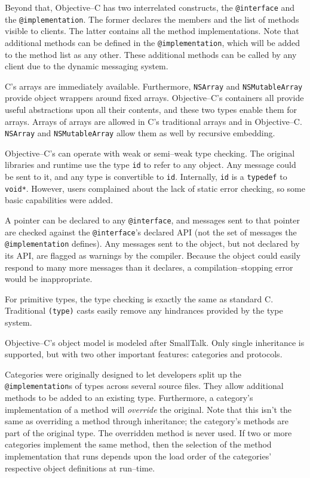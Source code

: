 Beyond that, Objective--C has two interrelated constructs, the
\texttt{@interface} and the \texttt{@implementation}. The former
declares the members and the list of methods visible to clients. The latter
contains all the method implementations. Note that additional methods can be
defined in the \texttt{@implementation}, which will be added to the method
list as any other. These additional methods can be called by any client due to
the dynamic messaging system.

C's arrays are immediately available. Furthermore, \texttt{NSArray} and
\texttt{NSMutableArray} provide object wrappers around fixed arrays.
Objective--C's containers all provide useful abstractions upon all their
contents, and these two types enable them for arrays. Arrays of arrays are
allowed in C's traditional arrays and in Objective--C. \texttt{NSArray} and
\texttt{NSMutableArray} allow them as well by recursive embedding.

Objective--C's can operate with weak or semi--weak type checking. The original
libraries and runtime use the type \texttt{id} to refer to any object. Any
message could be sent to it, and any type is convertible to \texttt{id}.
Internally, \texttt{id} is a \texttt{typedef} to \texttt{void*}. However,
users complained about the lack of static error checking, so some basic
capabilities were added.

A pointer can be declared to any \texttt{@interface}, and messages sent to
that pointer are checked against the \texttt{@interface}'s declared API (not
the set of messages the \texttt{@implementation} defines). Any messages sent
to the object, but not declared by its API, are flagged as warnings by the
compiler. Because the object could easily respond to many more messages than
it declares, a compilation--stopping error would be inappropriate.

For primitive types, the type checking is exactly the same as standard C.
Traditional \texttt{(type)} casts easily remove any hindrances provided by the
type system.

Objective--C's object model is modeled after SmallTalk. Only single
inheritance is supported, but with two other important features: categories
and protocols.

Categories were originally designed to let developers split up the
\texttt{@implementation}s of types across several source files. They
allow additional methods to be added to an existing type. Furthermore, a
category's implementation of a method will \emph{override} the original. Note
that this isn't the same as overriding a method through inheritance; the
category's methods are part of the original type. The overridden method is
never used. If two or more categories implement the same method, then the
selection of the method implementation that runs depends upon the load order
of the categories' respective object definitions at run--time.

